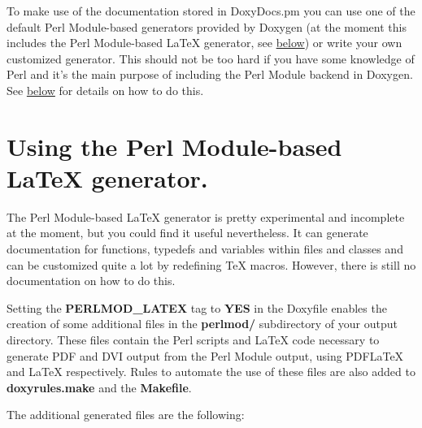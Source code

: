 To make use of the documentation stored in DoxyDocs.pm you can use one of the default Perl Module-\/based generators provided by Doxygen (at the moment this includes the Perl Module-\/based LaTeX generator, see \hyperlink{perlmod_perlmod_latex}{below}) or write your own customized generator. This should not be too hard if you have some knowledge of Perl and it's the main purpose of including the Perl Module backend in Doxygen. See \hyperlink{perlmod_doxydocs_format}{below} for details on how to do this.\hypertarget{perlmod_perlmod_latex}{}\section{Using the Perl Module-\/based LaTeX generator.}\label{perlmod_perlmod_latex}
The Perl Module-\/based LaTeX generator is pretty experimental and incomplete at the moment, but you could find it useful nevertheless. It can generate documentation for functions, typedefs and variables within files and classes and can be customized quite a lot by redefining TeX macros. However, there is still no documentation on how to do this.

Setting the {\bfseries PERLMOD\_\-LATEX} tag to {\bfseries YES} in the Doxyfile enables the creation of some additional files in the {\bfseries perlmod/} subdirectory of your output directory. These files contain the Perl scripts and LaTeX code necessary to generate PDF and DVI output from the Perl Module output, using PDFLaTeX and LaTeX respectively. Rules to automate the use of these files are also added to {\bfseries doxyrules.make} and the {\bfseries Makefile}.

The additional generated files are the following:


